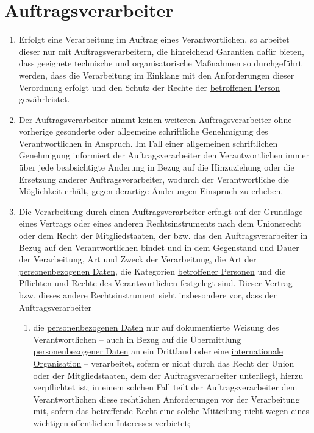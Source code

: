 \chapter{Auftragsverarbeiter}
\label{ch:28}


\begin{enumerate}

  \item Erfolgt eine Verarbeitung im Auftrag eines Verantwortlichen, so arbeitet dieser nur mit Auftragsverarbeitern,
   die hinreichend Garantien dafür bieten, dass geeignete technische und organisatorische Maßnahmen so durchgeführt
   werden, dass die Verarbeitung im Einklang mit den Anforderungen dieser Verordnung erfolgt und den Schutz der Rechte
   der \hyperref[itm:04-1]{betroffenen Person} gewährleistet.
  \label{itm:28-1}

  \item Der Auftragsverarbeiter nimmt keinen weiteren Auftragsverarbeiter ohne vorherige gesonderte oder allgemeine
   schriftliche Genehmigung des Verantwortlichen in Anspruch. Im Fall einer allgemeinen schriftlichen Genehmigung
   informiert der Auftragsverarbeiter den Verantwortlichen immer über jede beabsichtigte Änderung in Bezug auf die
   Hinzuziehung oder die Ersetzung anderer Auftragsverarbeiter, wodurch der Verantwortliche die Möglichkeit erhält,
   gegen derartige Änderungen Einspruch zu erheben.
  \label{itm:28-2}

  \item Die Verarbeitung durch einen Auftragsverarbeiter erfolgt auf der Grundlage eines Vertrags oder eines anderen
   Rechtsinstruments nach dem Unionsrecht oder dem Recht der Mitgliedstaaten, der bzw. das den Auftragsverarbeiter in
   Bezug auf den Verantwortlichen bindet und in dem Gegenstand und Dauer der Verarbeitung, Art und Zweck der
   Verarbeitung, die Art der \hyperref[itm:04-1]{personenbezogenen Daten}, die Kategorien \hyperref[itm:04-1]{betroffener Personen} und die Pflichten und Rechte
   des Verantwortlichen festgelegt sind. Dieser Vertrag bzw. dieses andere Rechtsinstrument sieht insbesondere vor,
   dass der Auftragsverarbeiter
  \label{itm:28-3-1}

  \begin{enumerate}
  
    \item die \hyperref[itm:04-1]{personenbezogenen Daten} nur auf dokumentierte Weisung des Verantwortlichen -- auch in Bezug auf die
     Übermittlung \hyperref[itm:04-1]{personenbezogener Daten} an ein Drittland oder eine \hyperref[itm:04-29]{internationale Organisation} -- verarbeitet, sofern
     er nicht durch das Recht der Union oder der Mitgliedstaaten, dem der Auftragsverarbeiter unterliegt, hierzu
     verpflichtet ist; in einem solchen Fall teilt der Auftragsverarbeiter dem Verantwortlichen diese rechtlichen
     Anforderungen vor der Verarbeitung mit, sofern das betreffende Recht eine solche Mitteilung nicht wegen eines
     wichtigen öffentlichen Interesses verbietet;
    \label{itm:28-3-1a}


\end{enumerate}
\end{enumerate}
